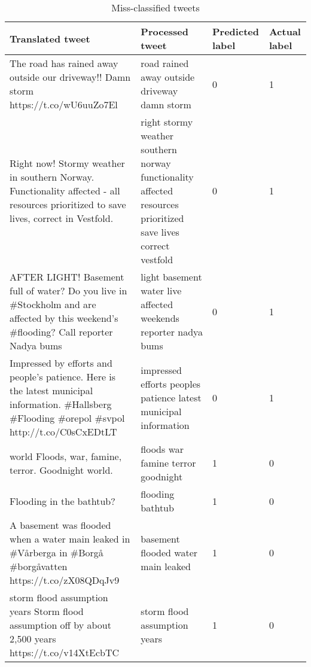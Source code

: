 \begin{table}
      \center
      \begin{tabular}{|p{5cm}|p{5cm}|l|l|}
    \hline
    Translated tweet & Processed tweet & Predicted label & Actual label\\
    \hline
    The road has rained away outside our driveway!! Damn storm https://t.co/wU6uuZo7El &
    road rained away outside driveway damn storm & 0 & 1 \\
    \hline
 Right now! Stormy weather in southern Norway. Functionality affected - all resources prioritized to save lives, correct in Vestfold. &
 right stormy weather southern norway functionality affected resources prioritized save lives correct vestfold & 0 & 1\\
    \hline
 AFTER LIGHT! Basement full of water? Do you live in \#Stockholm and are affected by this weekend's
 \#flooding? Call reporter Nadya bums &
 light basement water live affected weekends reporter nadya bums & 0 & 1\\
    \hline
 Impressed by efforts and people's patience. Here is the latest municipal information. \#Hallsberg
 \#Flooding \#orepol \#svpol http://t.co/C0sCxEDtLT &
 impressed efforts peoples patience latest municipal information & 0 & 1 \\
    \hline
     world Floods, war, famine, terror. Goodnight world. & 
 floods war famine terror goodnight & 1 & 0 \\
    \hline
     Flooding in the bathtub? & 
 flooding bathtub & 1 & 0 \\
    \hline
 A basement was flooded when a water main leaked in \#Vårberga in \#Borgå \#borgåvatten https://t.co/zX08QDqJv9 & 
 basement flooded water main leaked & 1 & 0 \\
    \hline
 storm flood assumption years Storm flood assumption off by about 2,500 years https://t.co/v14XtEcbTC & 
 storm flood assumption years & 1 & 0 \\
    \hline
  \end{tabular}
      \caption{Miss-classified tweets}
      \label{tab:tweets_missclassified}
  \end{table}
